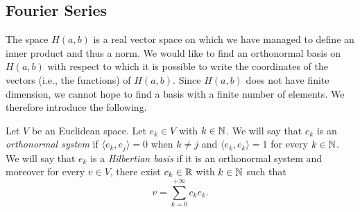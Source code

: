 \subsection{Fourier Series}
%
%

The space $H(a,b)$ is a real vector space on which we have managed to define an
inner product and thus a norm. We would like to find an orthonormal basis on
$H(a,b)$ with respect to which it is possible to write the coordinates of the
vectors (i.e., the functions) of $H(a,b)$. Since $H(a,b)$ does not have finite
dimension, we cannot hope to find a basis with a finite number of elements. We
therefore introduce the following.

\begin{definition}
%
Let $V$ be an Euclidean space. Let $e_k\in V$ with $k\in {\mathbb N}$. We will say that
$e_k$ is an \emph{orthonormal system}%
 if $\langle e_k, e_j\rangle = 0$ when $k\neq j$ and $\langle e_k, e_k\rangle = 1$ for every $k\in {\mathbb N}$. We will say that $e_k$ is a \emph{Hilbertian basis}%
 if it is an orthonormal system and moreover for every $v\in V$, there exist $c_k\in {\mathbb R}$ with $k\in{\mathbb N}$ such that
\begin{equation}\label{eq:49346}
  v = \sum_{k=0}^{+\infty} c_k e_k.
\end{equation}
\end{definition}

